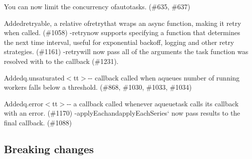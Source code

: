 \begin{DoxyItemize}
\item {\ttfamily You can now limit the concurrency of}auto{\ttfamily tasks. (\#635, \#637)}
\item {\ttfamily Added}retryable{\ttfamily , a relative of}retry{\ttfamily that wraps an async function, making it retry when called. (\#1058) -\/}retry{\ttfamily now supports specifying a function that determines the next time interval, useful for exponential backoff, logging and other retry strategies. (\#1161) -\/}retry{\ttfamily will now pass all of the arguments the task function was resolved with to the callback (\#1231).}
\item {\ttfamily Added}q.\+unsaturated$<$tt$>$-\/-\/ callback called when aqueue{\ttfamily \textquotesingle{}s number of running workers falls below a threshold. (\#868, \#1030, \#1033, \#1034)}
\item {\ttfamily Added}q.\+error$<$tt$>$-\/-\/ a callback called whenever aqueue{\ttfamily task calls its callback with an error. (\#1170) -\/}apply\+Each{\ttfamily and}apply\+Each\+Series` now pass results to the final callback. (\#1088)
\end{DoxyItemize}

\subsection*{Breaking changes}


